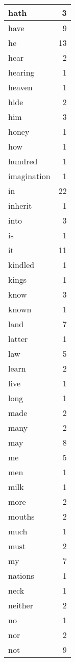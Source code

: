 \begin{center}
\begin{longtable}{l|r}
hath & 3 \\ \hline
have & 9 \\ \hline
he & 13 \\ \hline
hear & 2 \\ \hline
hearing & 1 \\ \hline
heaven & 1 \\ \hline
hide & 2 \\ \hline
him & 3 \\ \hline
honey & 1 \\ \hline
how & 1 \\ \hline
hundred & 1 \\ \hline
imagination & 1 \\ \hline
in & 22 \\ \hline
inherit & 1 \\ \hline
into & 3 \\ \hline
is & 1 \\ \hline
it & 11 \\ \hline
kindled & 1 \\ \hline
kings & 1 \\ \hline
know & 3 \\ \hline
known & 1 \\ \hline
land & 7 \\ \hline
latter & 1 \\ \hline
law & 5 \\ \hline
learn & 2 \\ \hline
live & 1 \\ \hline
long & 1 \\ \hline
made & 2 \\ \hline
many & 2 \\ \hline
may & 8 \\ \hline
me & 5 \\ \hline
men & 1 \\ \hline
milk & 1 \\ \hline
more & 2 \\ \hline
mouths & 2 \\ \hline
much & 1 \\ \hline
must & 2 \\ \hline
my & 7 \\ \hline
nations & 1 \\ \hline
neck & 1 \\ \hline
neither & 2 \\ \hline
no & 1 \\ \hline
nor & 2 \\ \hline
not & 9 \\ \hline

\end{longtable}
\end{center}

